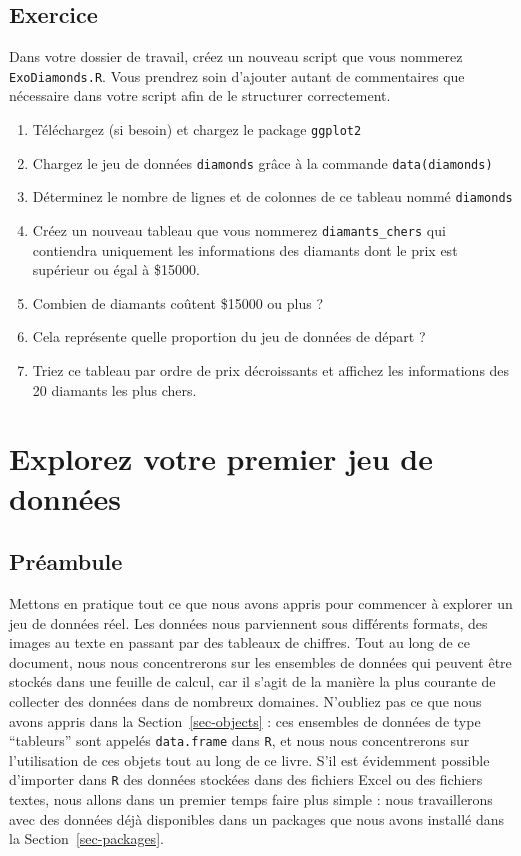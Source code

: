 \documentclass[
  letterpaper,
  DIV=11,
  numbers=noendperiod]{scrreprt}
\providecommand{\tightlist}{%
  \setlength{\itemsep}{0pt}\setlength{\parskip}{0pt}}\usepackage{longtable,booktabs,array}
\begin{document}
\hypertarget{sec-Exo-1}{%
\section{Exercice}\label{sec-Exo-1}}

Dans votre dossier de travail, créez un nouveau script que vous nommerez
\texttt{ExoDiamonds.R}. Vous prendrez soin d'ajouter autant de
commentaires que nécessaire dans votre script afin de le structurer
correctement.

\begin{enumerate}
\def\labelenumi{\arabic{enumi}.}
\tightlist
\item
  Téléchargez (si besoin) et chargez le package \texttt{ggplot2}
\item
  Chargez le jeu de données \texttt{diamonds} grâce à la commande
  \texttt{data(diamonds)}
\item
  Déterminez le nombre de lignes et de colonnes de ce tableau nommé
  \texttt{diamonds}
\item
  Créez un nouveau tableau que vous nommerez \texttt{diamants\_chers}
  qui contiendra uniquement les informations des diamants dont le prix
  est supérieur ou égal à \$15000.
\item
  Combien de diamants coûtent \$15000 ou plus ?
\item
  Cela représente quelle proportion du jeu de données de départ ?
\item
  Triez ce tableau par ordre de prix décroissants et affichez les
  informations des 20 diamants les plus chers.
\end{enumerate}


\hypertarget{sec-dataset}{%
\chapter{Explorez votre premier jeu de données}\label{sec-dataset}}

\hypertarget{pruxe9ambule-1}{%
\section{Préambule}\label{pruxe9ambule-1}}

Mettons en pratique tout ce que nous avons appris pour commencer à
explorer un jeu de données réel. Les données nous parviennent sous
différents formats, des images au texte en passant par des tableaux de
chiffres. Tout au long de ce document, nous nous concentrerons sur les
ensembles de données qui peuvent être stockés dans une feuille de
calcul, car il s'agit de la manière la plus courante de collecter des
données dans de nombreux domaines. N'oubliez pas ce que nous avons
appris dans la Section~\ref{sec-objects} : ces ensembles de données de
type ``tableurs'' sont appelés \texttt{data.frame} dans \texttt{R}, et
nous nous concentrerons sur l'utilisation de ces objets tout au long de
ce livre. S'il est évidemment possible d'importer dans \texttt{R} des
données stockées dans des fichiers Excel ou des fichiers textes, nous
allons dans un premier temps faire plus simple : nous travaillerons avec
des données déjà disponibles dans un packages que nous avons installé
dans la Section~\ref{sec-packages}.
\end{document}
